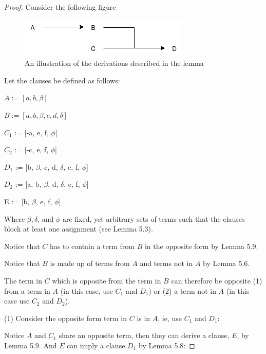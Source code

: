 \documentclass[manuscript]{acmart}
\begin{document}
    \begin{proof}

        Consider the following figure

        \begin{figure}[h]
            \includegraphics[scale=0.8]{318}
            \caption{An illustration of the derivations described in the lemma}
        \end{figure}

        Let the clauses be defined as follows:

        $A := [a, b, \beta]$
        
        $B := [a, b, \beta, c, d, \delta]$

        $C_1$ := [-a, e, f, $\phi$]

        $C_2$ := [-c, e, f, $\phi$]

        $D_1$ := [b, $\beta$, c, d, $\delta$, e, f, $\phi$]

        $D_2$ := [a, b, $\beta$, d, $\delta$, e, f, $\phi$]

        E := [b, $\beta$, e, f, $\phi$]

        Where $\beta, \delta$, and $\phi$ are fixed, yet arbitrary sets of terms such that the clauses block at least one assignment (see Lemma 5.3).

        Notice that $C$ has to contain a term from $B$ in the opposite form by Lemma 5.9.

        Notice that $B$ is made up of terms from $A$ and terms not in $A$
        by Lemma 5.6.

        The term in $C$ which is opposite from the term in $B$ can therefore
        be opposite (1) from a term in $A$ (in this case, use $C_1$ and $D_1$) or (2) a term not in $A$ (in this case use $C_2$ and $D_2$).
        
        (1) Consider the opposite form term in $C$ is in $A$, ie, use $C_1$
        and $D_1$:

        Notice $A$ and $C_1$ share an opposite term, then they can derive
        a clause, $E$, by Lemma 5.9. And $E$ can imply a clause $D_1$ by Lemma 5.8:


\end{proof}
\end{document}
